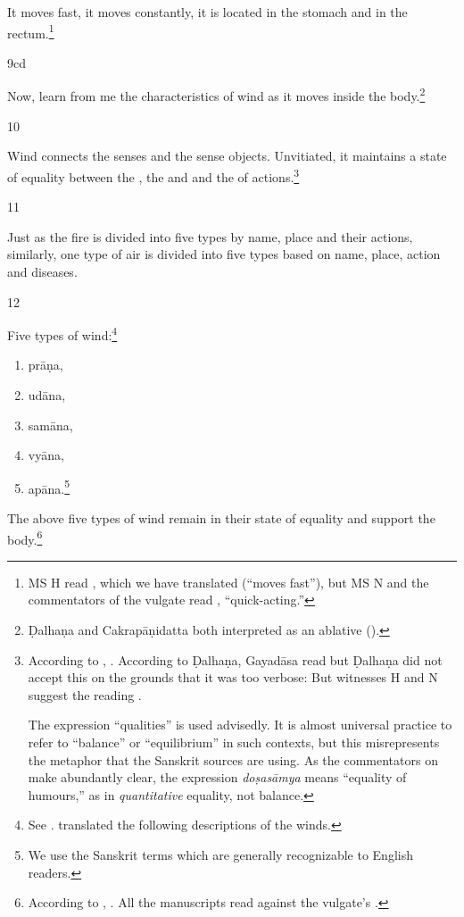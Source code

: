 \begin{translation}
	It moves fast, it moves constantly, it is located in the stomach and in
	the rectum.\footnote{MS H read , which we have translated
	(“moves fast”), but MS N and the commentators of the vulgate read
	, “quick-acting.”}

\item[9cd]

	Now, learn from me the characteristics of wind as it moves inside the
	body.\footnote{Ḍalhaṇa and Cakrapāṇidatta both interpreted  as
	an ablative ().}

\item[10] 

	Wind connects the senses and the sense objects.  Unvitiated, it
	maintains a state of equality between the , the
	 and  and the
	 of actions.\footnote{According to
	, .  According to Ḍalhaṇa,
	Gayadāsa read  but Ḍalhaṇa did not accept
	this on the grounds that it was too verbose:  But witnesses H and N suggest the reading
	.  
    
	The expression “qualities” is used advisedly. It is almost universal
	practice to refer to “balance” or “equilibrium” in such contexts, but
	this misrepresents the metaphor that the Sanskrit sources are using. As
	the commentators on \AH\  make abundantly clear, the
	expression \emph{doṣasāmya} means “equality of humours,” as in
	\emph{quantitative} equality, not balance.}

\item[11] 

	Just as the fire is divided into five types by name, place and their
	actions, similarly, one type of air is divided into five types based on
	name, place, action and diseases.

\item[12] 

Five types of wind:\footnote{See \cite{zysk-1993}.  \citet[S110]{zysk-2007}
translated the following descriptions of the winds.} \begin{enumerate} \item
		prāṇa, \item udāna, \item
			samāna, \item
vyāna, \item apāna.\footnote{We use the
Sanskrit terms which are generally recognizable to English readers.}
\end{enumerate} The above five types of wind remain in their state of equality
and support the body.\footnote{According to ,
. All the manuscripts read
  against the vulgate's
.}




\end{translation}
